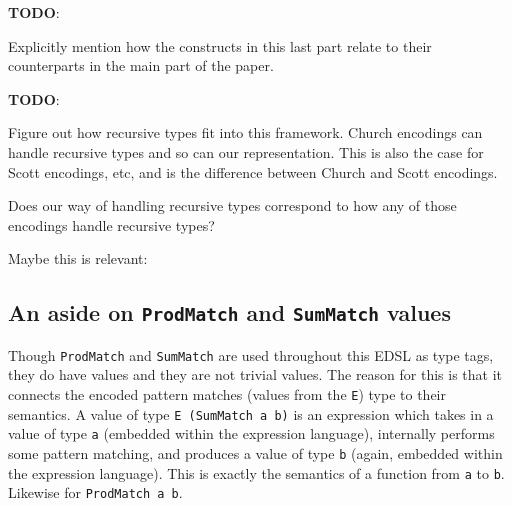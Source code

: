 \documentclass[sigplan,anonymous,review]{acmart}
\newcommand{\ttt}{\texttt}
\newenvironment{todo}
  {\begin{tcolorbox}
   \textbf{TODO}:
  }
  {\end{tcolorbox}
  }
\begin{document}
\begin{todo}
  Explicitly mention how the constructs in this last part
  relate to their counterparts in the main part of the paper.
\end{todo}

\begin{todo}
  Figure out how recursive types fit into this framework. Church encodings can
  handle recursive types and so can our representation. This is also the case
  for Scott encodings, etc, and is the difference between Church and Scott
  encodings.

  Does our way of handling recursive types correspond to how any of
  those encodings handle recursive types?

  Maybe this is relevant: \href{https://www.reddit.com/r/haskell/comments/hvlh6a/generalized_church_encoding_is_the_curryhoward_of/}{\color{blue}{Generalized Church encoding is the Curry-Howard of Knaster-Tarski}}
\end{todo}




\subsection{An aside on \ttt{ProdMatch} and \ttt{SumMatch} values}

Though \ttt{ProdMatch} and \ttt{SumMatch} are used throughout this EDSL as type
tags, they do have values and they are not trivial values. The reason for this
is that it connects the encoded pattern matches (values from the \ttt{E}) type
to their semantics. A value of type \ttt{E (SumMatch a b)} is an expression
which takes in a value of type \ttt{a} (embedded within the expression
language), internally performs some pattern matching, and produces a value of
type \ttt{b} (again, embedded within the expression language). This is exactly
the semantics of a function from \ttt{a} to \ttt{b}. Likewise for \ttt{ProdMatch a b}.
\end{document}

